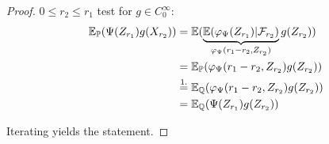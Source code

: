 \begin{proof}
    $0\leq r_2\leq r_1$ test for $g\in C_0^\infty$:
    \begin{align*}
        \mathbb{E}_{\mathbb{P}}(\Psi(Z_{r_1})g(X_{r_2}))&=\mathbb{E}(\underbrace{\mathbb{E}(\varphi_\Psi(Z_{r_1})|\mathcal{F}_{r_2})}_{\varphi_\Psi(r_1-r_2,Z_{r_2})}g(Z_{r_2}))\\
        &=\mathbb{E}_{\mathbb{P}}(\varphi_\Psi(r_1-r_2,Z_{r_2})g(Z_{r_2}))\\
        &\stackrel{1.}{=}\mathbb{E}_{\mathbb{Q}}(\varphi_\Psi(r_1-r_2,Z_{r_2})g(Z_{r_2}))\\
        &=\mathbb{E}_{\mathbb{Q}}(\Psi(Z_{r_1})g(Z_{r_2}))
    \end{align*}

    Iterating yields the statement.

\end{proof}

